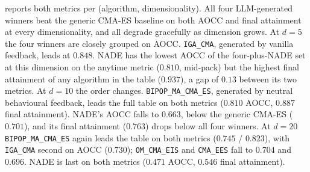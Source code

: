  reports both metrics per (algorithm, dimensionality). All four LLM-generated winners beat the generic CMA-ES baseline on both AOCC and final attainment at every dimensionality, and all degrade gracefully as dimension grows. At $d = 5$ the four winners are closely grouped on AOCC. \texttt{IGA\_CMA}, generated by vanilla feedback, leads at $0.848$. NADE has the lowest AOCC of the four-plus-NADE set at this dimension on the anytime metric ($0.810$, mid-pack) but the highest final attainment of any algorithm in the table ($0.937$), a gap of $0.13$ between its two metrics. At $d = 10$ the order changes. \texttt{BIPOP\_MA\_CMA\_ES}, generated by neutral behavioural feedback, leads the full table on both metrics ($0.810$ AOCC, $0.887$ final attainment). NADE's AOCC falls to $0.663$, below the generic CMA-ES ($0.701$), and its final attainment ($0.763$) drops below all four winners. At $d = 20$ \texttt{BIPOP\_MA\_CMA\_ES} again leads the table on both metrics ($0.745$ / $0.823$), with \texttt{IGA\_CMA} second on AOCC ($0.730$); \texttt{OM\_CMA\_EIS} and \texttt{CMA\_EES} fall to $0.704$ and $0.696$. NADE is last on both metrics ($0.471$ AOCC, $0.546$ final attainment).
